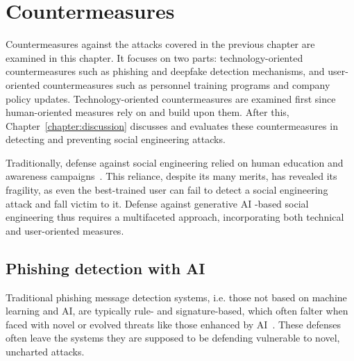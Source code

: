 \chapter{Countermeasures\label{chapter:countermeasures}}

Countermeasures against the attacks covered in the previous chapter are examined in this chapter. It focuses on two parts: technology-oriented countermeasures such as phishing and deepfake detection mechanisms, and user-oriented countermeasures such as personnel training programs and company policy updates. Technology-oriented countermeasures are examined first since human-oriented measures rely on and build upon them. After this, Chapter~\ref{chapter:discussion} discusses and evaluates these countermeasures in detecting and preventing social engineering attacks.

Traditionally, defense against social engineering relied on human education and awareness campaigns~\citep{fakhouri_AI_Driven_Solutions_SE_Attacks_2024}. This reliance, despite its many merits, has revealed its fragility, as even the best-trained user can fail to detect a social engineering attack and fall victim to it. Defense against generative AI -based social engineering thus requires a multifaceted approach, incorporating both technical and user-oriented measures.


\section{Phishing detection with AI}

Traditional phishing message detection systems, i.e. those not based on machine learning and AI, are typically rule- and signature-based, which often falter when faced with novel or evolved threats like those enhanced by AI~\citep{fakhouri_AI_Driven_Solutions_SE_Attacks_2024}. These defenses often leave the systems they are supposed to be defending vulnerable to novel, uncharted attacks.

